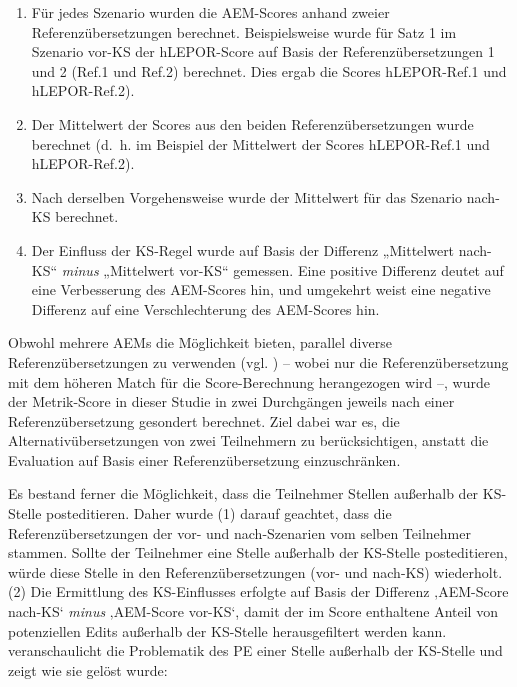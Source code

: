 \begin{enumerate}[label = {(\arabic*)}, align = left]
\item
Für jedes Szenario wurden die AEM-Scores anhand zweier Referenzübersetzungen berechnet. Beispielsweise wurde für Satz 1 im Szenario vor-KS der hLEPOR-Score auf Basis der Referenzübersetzungen 1 und 2 (Ref.1 und Ref.2) berechnet. Dies ergab die Scores hLEPOR-Ref.1 und hLEPOR-Ref.2).
\item
Der Mittelwert der Scores aus den beiden Referenzübersetzungen wurde berechnet (d.~h. im Beispiel der Mittelwert der Scores hLEPOR-Ref.1 und hLEPOR-Ref.2).
\item
Nach derselben Vorgehensweise wurde der Mittelwert für das Szenario nach-KS berechnet.
\item
Der Einfluss der KS-Regel wurde auf Basis der Differenz „Mittelwert nach-KS“ \textit{minus} „Mittelwert vor-KS“ gemessen. Eine positive Differenz deutet auf eine Verbesserung des AEM-Scores hin, und umgekehrt weist eine negative Differenz auf eine Verschlechterung des AEM-Scores hin.
\end{enumerate}

Obwohl mehrere AEMs die Möglichkeit bieten, parallel diverse Referenzübersetzungen zu verwenden (vgl. \citealt{Han2018}) -- wobei nur die Referenzübersetzung mit dem höheren Match für die Score-Berechnung herangezogen wird --, wurde der Metrik-Score in dieser Studie in zwei Durchgängen jeweils nach einer Referenzübersetzung gesondert berechnet. Ziel dabei war es, die Alternativübersetzungen von zwei Teilnehmern zu berücksichtigen, anstatt die Evaluation auf Basis einer Referenzübersetzung einzuschränken.

Es bestand ferner die Möglichkeit, dass die Teilnehmer Stellen außerhalb der KS-Stelle posteditieren. Daher wurde (1) darauf geachtet, dass die Referenzübersetzungen der vor- und nach-Szenarien vom selben Teilnehmer stammen. Sollte der Teilnehmer eine Stelle außerhalb der KS-Stelle posteditieren, würde diese Stelle in den Referenzübersetzungen (vor- und nach-KS) wiederholt. (2) Die Ermittlung des KS-Einflusses erfolgte auf Basis der Differenz ‚AEM-Score nach-KS‘ \textit{minus} ‚AEM-Score vor-KS‘, damit der im Score enthaltene Anteil von potenziellen Edits außerhalb der KS-Stelle herausgefiltert werden kann.  veranschaulicht die Problematik des PE einer Stelle außerhalb der KS-Stelle und zeigt wie sie gelöst wurde:

